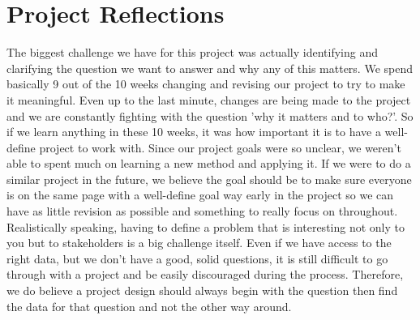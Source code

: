 \documentclass[12pt]{article}
\begin{document}
\section{Project Reflections} \label{sec:Reflections}
The biggest challenge we have for this project was actually identifying and clarifying the question we want to answer and why any of this matters. We spend basically 9 out of the 10 weeks changing and revising our project to try to make it meaningful. Even up to the last minute, changes are being made to the project and we are constantly fighting with the question 'why it matters and to who?'. So if we learn anything in these 10 weeks, it was how important it is to have a well-define project to work with. Since our project goals were so unclear, we weren't able to spent much on learning a new method and applying it. If we were to do a similar project in the future, we believe the goal should be to make sure everyone is on the same page with a well-define goal way early in the project so we can have as little revision as possible and something to really focus on throughout. Realistically speaking, having to define a problem that is interesting not only to you but to stakeholders is a big challenge itself. Even if we have access to the right data, but we don't have a good, solid questions, it is still difficult to go through with a project and be easily discouraged during the process. Therefore, we do believe a project design should always begin with the question then find the data for that question and not the other way around. 
\end{document}
